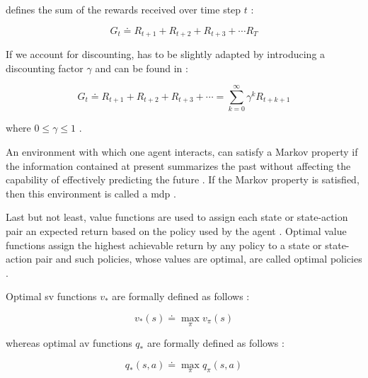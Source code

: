  defines the sum of the rewards received over time step $t$ \citep[p. 73]{Sutton2017}:

\begin{equation}
\label{eq:expected_return}
	G_t  \doteq R_{t+1} + R_{t+2} + R_{t+3} + \cdots R_{T}
\end{equation}

If we account for discounting,  has to be slightly adapted by introducing a discounting factor $\gamma$ and can be found in :

\begin{equation}
\label{eq:expected_discounted_return}
	G_t  \doteq R_{t+1} + R_{t+2} + R_{t+3} + \cdots = \sum_{k=0}^\infty \gamma^k R_{t+k+1}
\end{equation}

where $0 \leq \gamma \leq 1$ \citep[p. 73]{Sutton2017}.

An environment  with which one agent interacts, can satisfy a Markov property if the information contained at present summarizes the past without affecting the capability of effectively predicting the future \citep[p. 73]{Sutton2017}. If the Markov property is satisfied, then this environment is called a \gls{mdp} \citep[p. 73]{Sutton2017}.

Last but not least, value functions are used to assign each state or state-action pair an expected return based on the policy used by the agent \citep[p. 74]{Sutton2017}. Optimal value functions assign the highest achievable return by any policy to a state or state-action pair  and such policies, whose values are optimal, are called optimal policies \citep[p. 74]{Sutton2017}.

Optimal \gls{sv} functions $v_*$ are formally defined as follows \citep[p. 74]{Sutton2017}:

\begin{equation}
	v_* (s) \doteq \max_\pi v_\pi (s)
\end{equation}

whereas optimal \gls{av} functions $q_*$ are formally defined as follows \citep[p. 74]{Sutton2017}:

\begin{equation}
	q_* (s,a) \doteq \max_\pi q_\pi (s,a)
\end{equation}

\subsection{}
\label{subsec:dp}

